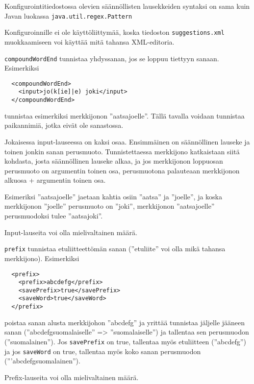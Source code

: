 \documentclass[12pt]{article}
\begin{document}
Konfigurointitiedostossa olevien säännöllisten lausekkeiden syntaksi on
sama kuin Javan luokassa \verb=java.util.regex.Pattern=

Konfiguroinnille ei ole käyttöliittymää, koska tiedoston
\verb=suggestions.xml= muokkaamiseen voi käyttää mitä tahansa
XML-editoria.




\bigskip
\verb|compoundWordEnd| tunnistaa yhdyssanan, jos se loppuu tiettyyn sanaan.
Esimerkiksi

\begin{verbatim}
  <compoundWordEnd>
    <input>jo(k[ie]|e) joki</input>
  </compoundWordEnd>
\end{verbatim}

tunnistaa esimerkiksi merkkijonon ''aatsajoelle''. Tällä tavalla
voidaan tunnistaa paikannimiä, jotka eivät ole sanastossa.

Jokaisessa input-lauseessa on kaksi osaa. Ensimmäinen on säännöllinen
lauseke ja toinen jonkin sanan perusmuoto. Tunnistettaessa merkkijono
katkaistaan siitä kohdasta, josta säännöllinen lauseke alkaa, ja jos
merkkijonon loppuosan perusmuoto on argumentin toinen osa,
perusmuotona palauteaan merkkijonon alkuosa + argumentin toinen osa.

Esimeriksi ''aatsajoelle'' jaetaan kahtia osiin ''aatsa'' ja
''joelle'', ja koska merkkijonon ''joelle'' perusmuoto on ''joki'',
merkkijonon ''aatsajoelle'' perusmuodoksi tulee ''aatsajoki''.

Input-lauseita voi olla mielivaltainen määrä.




\bigskip
\verb|prefix| tunnistaa etuliitteettömän sanan (''etuliite'' voi olla
mikä tahansa merkkijono). Esimerkiksi

\begin{verbatim}
  <prefix>
    <prefix>abcdefg</prefix>
    <savePrefix>true</savePrefix>
    <saveWord>true</saveWord>
  </prefix>
\end{verbatim}

poistaa sanan alusta merkkijohon ''abcdefg'' ja yrittää tunnistaa
jäljelle jääneen sanan (''abcdefgsuomalaiselle'' => ''suomalaiselle'')
ja tallentaa sen perusmuodon (''suomalainen''). Jos \verb|savePrefix|
on true, tallentaa myös etuliitteen (''abcdefg'') ja jos
\verb|saveWord| on true, tallentaa myös koko sanan perusmuodon
('''abcdefgsuomalainen'').

Prefix-lauseita voi olla mielivaltainen määrä.
\end{document}
